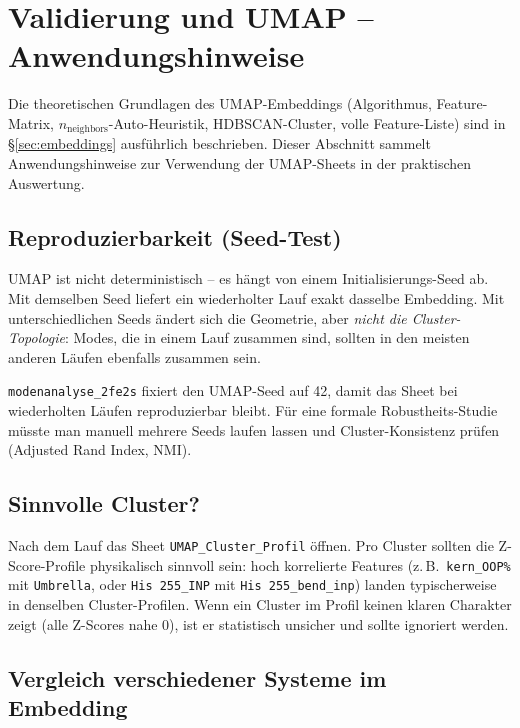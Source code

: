 \documentclass[11pt,a4paper,twoside]{article}
\theoremstyle{remark}
\begin{document}
\section{Validierung und UMAP -- Anwendungshinweise}

Die theoretischen Grundlagen des UMAP-Embeddings (Algorithmus,
Feature-Matrix, $n_\text{neighbors}$-Auto-Heuristik, HDBSCAN-Cluster,
volle Feature-Liste) sind in \S\ref{sec:embeddings} ausf\"uhrlich
beschrieben. Dieser Abschnitt sammelt Anwendungshinweise zur
Verwendung der UMAP-Sheets in der praktischen Auswertung.

\subsection{Reproduzierbarkeit (Seed-Test)}

UMAP ist nicht deterministisch -- es h\"angt von einem
Initialisierungs-Seed ab. Mit demselben Seed liefert ein wiederholter
Lauf exakt dasselbe Embedding. Mit unterschiedlichen Seeds \"andert
sich die Geometrie, aber \emph{nicht die Cluster-Topologie}: Modes,
die in einem Lauf zusammen sind, sollten in den meisten anderen
L\"aufen ebenfalls zusammen sein.

\texttt{modenanalyse\_2fe2s} fixiert den UMAP-Seed auf 42, damit das
Sheet bei wiederholten L\"aufen reproduzierbar bleibt. F\"ur eine
formale Robustheits-Studie m\"usste man manuell mehrere Seeds laufen
lassen und Cluster-Konsistenz pr\"ufen (Adjusted Rand Index, NMI).

\subsection{Sinnvolle Cluster?}

Nach dem Lauf das Sheet \texttt{UMAP\_Cluster\_Profil} \"offnen.
Pro Cluster sollten die Z-Score-Profile physikalisch sinnvoll sein:
hoch korrelierte Features (z.\,B.\ \texttt{kern\_OOP\%} mit
\texttt{Umbrella}, oder \texttt{His 255\_INP} mit
\texttt{His 255\_bend\_inp}) landen typischerweise in denselben
Cluster-Profilen. Wenn ein Cluster im Profil keinen klaren
Charakter zeigt (alle Z-Scores nahe 0), ist er statistisch
unsicher und sollte ignoriert werden.

\subsection{Vergleich verschiedener Systeme im Embedding}
\end{document}
